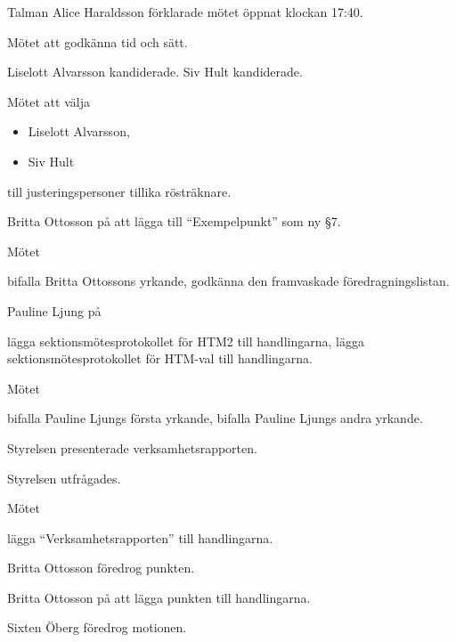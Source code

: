 \documentclass{dsekminutes}
\begin{document}
\begin{parasection}
  Talman Alice Haraldsson förklarade mötet öppnat klockan 17:40.

  Mötet  att godkänna tid och sätt.

  Liselott Alvarsson kandiderade.  Siv Hult kandiderade.

  Mötet  att välja
  \begin{itemize}
  \item Liselott Alvarsson,
  \item Siv Hult
  \end{itemize}
  till justeringspersoner tillika rösträknare.

  Britta Ottosson \yrkade på att lägga till ``Exempelpunkt''
  som ny §7.

  Mötet 
  \begin{attlist}
    \att bifalla Britta Ottossons yrkande,
    \att godkänna den framvaskade föredragningslistan.
  \end{attlist}

  Pauline Ljung \yrkade på
  \begin{attlist}
    \att lägga sektionsmötesprotokollet för HTM2 till handlingarna,
    \att lägga sektionsmötesprotokollet för HTM-val till handlingarna.
  \end{attlist}

  Mötet 
  \begin{attlist}
    \att bifalla Pauline Ljungs första yrkande,
    \att bifalla Pauline Ljungs andra yrkande.
  \end{attlist}

  Styrelsen presenterade verksamhetsrapporten.

  Styrelsen utfrågades.

  Mötet 
  \begin{attlist}
    \att lägga “Verksamhetsrapporten” till handlingarna.
  \end{attlist}

  Britta Ottosson föredrog punkten.

  Britta Ottosson \yrkade på att lägga punkten till handlingarna.

  Sixten Öberg föredrog motionen.


\end{parasection}
\end{document}
